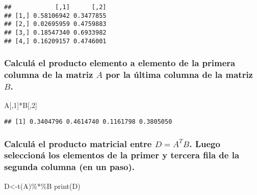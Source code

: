 \documentclass[
]{article}
\newenvironment{Shaded}{\begin{snugshade}}{\end{snugshade}}
\newcommand{\DecValTok}[1]{\textcolor[rgb]{0.00,0.00,0.81}{#1}}
\newcommand{\FunctionTok}[1]{\textcolor[rgb]{0.00,0.00,0.00}{#1}}
\newcommand{\NormalTok}[1]{#1}
\newcommand{\OtherTok}[1]{\textcolor[rgb]{0.56,0.35,0.01}{#1}}
\newcommand{\SpecialCharTok}[1]{\textcolor[rgb]{0.00,0.00,0.00}{#1}}
\begin{document}
\begin{verbatim}
##            [,1]      [,2]
## [1,] 0.58106942 0.3477855
## [2,] 0.02695959 0.4759883
## [3,] 0.18547340 0.6933982
## [4,] 0.16209157 0.4746001
\end{verbatim}

\hypertarget{calculuxe1-el-producto-elemento-a-elemento-de-la-primera-columna-de-la-matriz-a-por-la-uxfaltima-columna-de-la-matriz-b.}{%
\subsubsection{\texorpdfstring{Calculá el producto elemento a elemento
de la primera columna de la matriz \(A\) por la última columna de la
matriz
\(B\).}{Calculá el producto elemento a elemento de la primera columna de la matriz A por la última columna de la matriz B.}}\label{calculuxe1-el-producto-elemento-a-elemento-de-la-primera-columna-de-la-matriz-a-por-la-uxfaltima-columna-de-la-matriz-b.}}

\begin{Shaded}
\begin{Highlighting}[]
\NormalTok{A[,}\DecValTok{1}\NormalTok{]}\SpecialCharTok{*}\NormalTok{B[,}\DecValTok{2}\NormalTok{]}
\end{Highlighting}
\end{Shaded}

\begin{verbatim}
## [1] 0.3404796 0.4614740 0.1161798 0.3805050
\end{verbatim}

\hypertarget{calculuxe1-el-producto-matricial-entre-d-atb.-luego-seleccionuxe1-los-elementos-de-la-primer-y-tercera-fila-de-la-segunda-columna-en-un-paso.}{%
\subsubsection{\texorpdfstring{Calculá el producto matricial entre
\(D = A^TB\). Luego seleccioná los elementos de la primer y tercera fila
de la segunda columna (en un
paso).}{Calculá el producto matricial entre D = A\^{}TB. Luego seleccioná los elementos de la primer y tercera fila de la segunda columna (en un paso).}}\label{calculuxe1-el-producto-matricial-entre-d-atb.-luego-seleccionuxe1-los-elementos-de-la-primer-y-tercera-fila-de-la-segunda-columna-en-un-paso.}}

\begin{Shaded}
\begin{Highlighting}[]
\NormalTok{D}\OtherTok{\textless{}{-}}\FunctionTok{t}\NormalTok{(A)}\SpecialCharTok{\%*\%}\NormalTok{B}
\FunctionTok{print}\NormalTok{(D)}
\end{Highlighting}
\end{Shaded}
\end{document}
